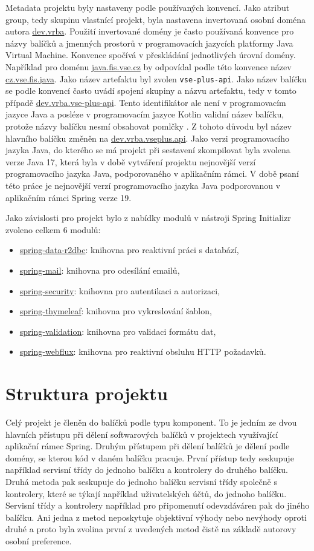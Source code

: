 Metadata projektu byly nastaveny podle používaných konvencí. Jako atribut group, tedy skupinu vlastnící projekt, byla nastavena invertovaná osobní doména autora \url{dev.vrba}. Použití invertované domény je často používaná konvence pro názvy balíčků a jmenných prostorů v programovacích jazycích platformy Java Virtual Machine. Konvence spočívá v přeskládání jednotlivých úrovní domény. Například pro doménu \url{java.fis.vse.cz} by odpovídal podle této konvence název \url{cz.vse.fis.java}. Jako název artefaktu byl zvolen \verb|vse-plus-api|. Jako název balíčku se podle konvencí často uvádí spojení skupiny a názvu artefaktu, tedy v tomto případě \url{dev.vrba.vse-plus-api}. Tento identifikátor ale není v programovacím jazyce Java a posléze v programovacím jazyce Kotlin validní název balíčku, protože názvy balíčku nesmí obsahovat pomlčky \cite{gosling_java_2022}. Z tohoto důvodu byl název hlavního balíčku změněn na \url{dev.vrba.vseplus.api}. Jako verzi programovacího jazyka Java, do kterého se má projekt při sestavení zkompilovat byla zvolena verze Java 17, která byla v době vytváření projektu nejnovější verzí programovacího jazyka Java, podporovaného v aplikačním rámci. V době psaní této práce je nejnovější verzí programovacího jazyka Java podporovanou v aplikačním rámci Spring verze 19.

Jako závislosti pro projekt bylo z nabídky modulů v nástroji Spring Initializr zvoleno celkem 6 modulů:

\begin{itemize}
    \item \url{spring-data-r2dbc}: knihovna pro reaktivní práci s databází,
    \item \url{spring-mail}: knihovna pro odesílání emailů,
    \item \url{spring-security}: knihovna pro autentikaci a autorizaci,
    \item \url{spring-thymeleaf}: knihovna pro vykreslování šablon,
    \item \url{spring-validation}: knihovna pro validaci formátu dat,
    \item \url{spring-webflux}: knihovna pro reaktivní obsluhu HTTP požadavků.
\end{itemize}

\section{Struktura projektu}

Celý projekt je členěn do balíčků podle typu komponent. To je jedním ze dvou hlavních přístupu při dělení softwarových balíčků v projektech využívající aplikační rámec Spring. Druhým přístupem při dělení balíčků je dělení podle domény, se kterou kód v daném balíčku pracuje. První přístup tedy seskupuje například servisní třídy do jednoho balíčku a kontrolery do druhého balíčku. Druhá metoda pak seskupuje do jednoho balíčku servisní třídy společně s kontrolery, které se týkají například uživatelských účtů, do jednoho balíčku. Servisní třídy a kontrolery například pro připomenutí odevzdáváren pak do jiného balíčku. Ani jedna z metod neposkytuje objektivní výhody nebo nevýhody oproti druhé a proto byla zvolina první z uvedených metod čistě na základě autorovy osobní preference. 

